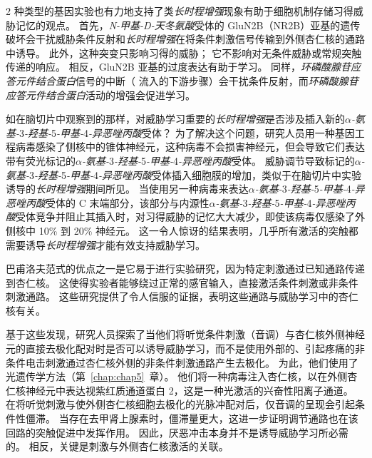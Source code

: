 2 种类型的基因实验也有力地支持了类\textit{长时程增强}现象有助于细胞机制存储习得威胁记忆的观点。
首先，\textit{N-甲基-D-天冬氨酸}受体的 GluN2B（NR2B）亚基的遗传破坏会干扰威胁条件反射和\textit{长时程增强}在将条件刺激信号传输到外侧杏仁核的通路中诱导。
此外，这种突变只影响习得的威胁；
它不影响对无条件威胁或常规突触传递的响应。
相反，GluN2B 亚基的过度表达有助于学习。
同样，\textit{环磷酸腺苷应答元件结合蛋白}信号的中断（ 流入的下游步骤）会干扰条件反射，而\textit{环磷酸腺苷应答元件结合蛋白}活动的增强会促进学习。


如在脑切片中观察到的那样，对威胁学习重要的\textit{长时程增强}是否涉及插入新的\textit{$\alpha$-氨基-}3\textit{-羟基-}5\textit{-甲基-}4\textit{-异恶唑丙酸}受体？
为了解决这个问题，研究人员用一种基因工程病毒感染了侧核中的锥体神经元，这种病毒不会损害神经元，但会导致它们表达带有荧光标记的\textit{$\alpha$-氨基-}3\textit{-羟基-}5\textit{-甲基-}4\textit{-异恶唑丙酸}受体。
威胁调节导致标记的\textit{$\alpha$-氨基-}3\textit{-羟基-}5\textit{-甲基-}4\textit{-异恶唑丙酸}受体插入细胞膜的增加，类似于在脑切片中实验诱导的\textit{长时程增强}期间所见。
当使用另一种病毒来表达\textit{$\alpha$-氨基-}3\textit{-羟基-}5\textit{-甲基-}4\textit{-异恶唑丙酸}受体的 C 末端部分，该部分与内源性\textit{$\alpha$-氨基-}3\textit{-羟基-}5\textit{-甲基-}4\textit{-异恶唑丙酸}受体竞争并阻止其插入时，对习得威胁的记忆大大减少，即使该病毒仅感染了外侧核中 10\% 到 20\% 神经元。
这一令人惊讶的结果表明，几乎所有激活的突触都需要诱导\textit{长时程增强}才能有效支持威胁学习。


巴甫洛夫范式的优点之一是它易于进行实验研究，因为特定刺激通过已知通路传递到杏仁核。
这使得实验者能够绕过正常的感官输入，直接激活条件刺激或非条件刺激通路。
这些研究提供了令人信服的证据，表明这些通路与威胁学习中的杏仁核有关。


基于这些发现，研究人员探索了当他们将听觉条件刺激（音调）与杏仁核外侧神经元的直接去极化配对时是否可以诱导威胁学习，而不是使用外部的、引起疼痛的非条件电击刺激通过杏仁核外侧的非条件刺激通路产生去极化。
为此，他们使用了光遗传学方法（第~\ref{chap:chap5}~章）。
他们将一种病毒注入杏仁核，以在外侧杏仁核神经元中表达视紫红质通道蛋白 2，这是一种光激活的兴奋性阳离子通道。
在将听觉刺激与使外侧杏仁核细胞去极化的光脉冲配对后，仅音调的呈现会引起条件性僵滞。
当存在去甲肾上腺素时，僵滞量更大，这进一步证明调节通路也在该回路的突触促进中发挥作用。
因此，厌恶冲击本身并不是诱导威胁学习所必需的。
相反，关键是刺激与外侧杏仁核激活的关联。


